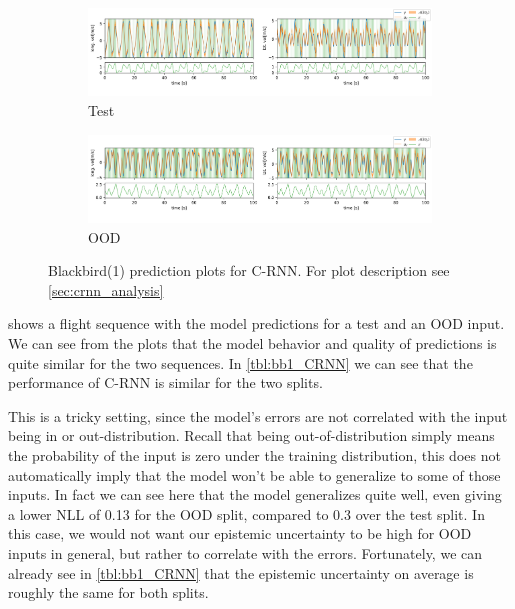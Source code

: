 \begin{figure}[h]
  \centering
  
  \begin{subfigure}[b]{\textwidth}
    \includegraphics[width=\textwidth]{Experiments/figs/bb1_test.png}
    \caption{Test}
  \end{subfigure}
  
  \begin{subfigure}[b]{\textwidth}
    \includegraphics[width=\textwidth]{Experiments/figs/bb1_ood.png}
    \caption{OOD}
  \end{subfigure}
  
  \caption{Blackbird(1) prediction plots for C-RNN. For plot description see \cref{sec:crnn_analysis}}
  \label{fig:bb1_run}
\end{figure}

 shows a flight sequence with the model predictions for a test and an OOD input. We can see from the plots that the model behavior and quality of predictions is quite similar for the two sequences. In \cref{tbl:bb1_CRNN} we can see that the performance of C-RNN is similar for the two splits.

This is a tricky setting, since the model's errors are not correlated with the input being in or out-distribution. Recall that being out-of-distribution simply means the probability of the input is zero under the training distribution, this does not automatically imply that the model won't be able to generalize to some of those inputs. In fact we can see here that the model generalizes quite well, even giving a lower NLL of 0.13 for the OOD split, compared to 0.3 over the test split. In this case, we would not want our epistemic uncertainty to be high for OOD inputs in general, but rather to correlate with the errors. 
Fortunately, we can already see in \cref{tbl:bb1_CRNN} that the epistemic uncertainty on average is roughly the same for both splits. 

